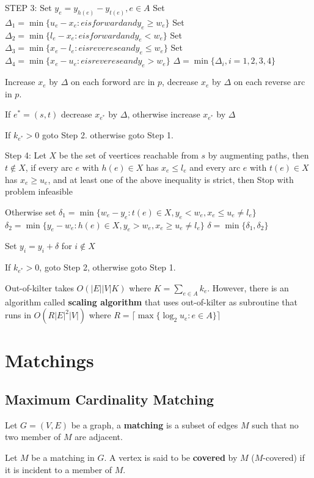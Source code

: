 			STEP 3: Set $y_e = y_{h(e)} - y_{t(e)}, e\in A$
			Set $\Delta_1 = \min\{u_e - x_e: e is forward and y_e \ge w_e\}$
			Set $\Delta_2 = \min\{l_e - x_e: e is forward and y_e < w_e\}$
			Set $\Delta_3 = \min\{x_e - l_e: e is reverese and y_e \le w_e\}$
			Set $\Delta_4 = \min\{x_e - u_e: e is reverese and y_e > w_e\}$
			$\Delta = \min\{\Delta_i, i = 1, 2, 3, 4\}$

			Increase $x_e$ by $\Delta$ on each forword arc in $p$, decrease $x_e$ by $\Delta$ on each reverse arc in $p$.

			If $e^* = (s, t)$ decrease $x_{e^*}$ by $\Delta$, otherwise increase $x_{e^*}$ by $\Delta$

			If $k_{e^*} > 0$ goto Step 2. otherwise goto Step 1.

			Step 4: Let $X$ be the set of veertices reachable from $s$ by augmenting paths, then $t \notin X$, if every arc $e$ with $h(e) \in X$ has $x_e \le l_e$ and every arc $e$ with $t(e) \in X$ has $x_e \ge u_e$, and at least one of the above inequality is strict, then Stop with problem infeasible

			Otherwise set
			$\delta_1 = \min\{w_e - y_e: t(e) \in X, y_e < w_e, x_e \le u_e \neq l_e\}$
			$\delta_2 = \min\{y_e - w_e: h(e) \in X, y_e > w_e, x_e \ge u_e \neq l_e\}$
			$\delta = \min\{\delta_1, \delta_2\}$

			Set $y_i = y_i + \delta$ for $i \notin X$

			If $k_{e^*} > 0$, goto Step 2, otherwise goto Step 1.

			Out-of-kilter takes $O(|E||V|K)$ where $K = \sum_{e\in A} k_e$. However, there is an algorithm called \textbf{scaling algorithm} that uses out-of-kilter as subroutine that runs in $O(R|E|^2|V|)$ where $R = \lceil \max\{\log_2 u_e: e\in A\}\rceil$

	\chapter{Matchings}
		\section{Maximum Cardinality Matching}
			\begin{definition}[Matching]
				Let $G = (V, E)$ be a graph, a \textbf{matching} is a subset of edges $M$ such that no two member of $M$ are adjacent.
			\end{definition}

			\begin{definition}[Cover]
				Let $M$ be a matching in $G$. A vertex is said to be \textbf{covered} by $M$ ($M$-covered) if it is incident to a member of $M$.
			\end{definition}
			
